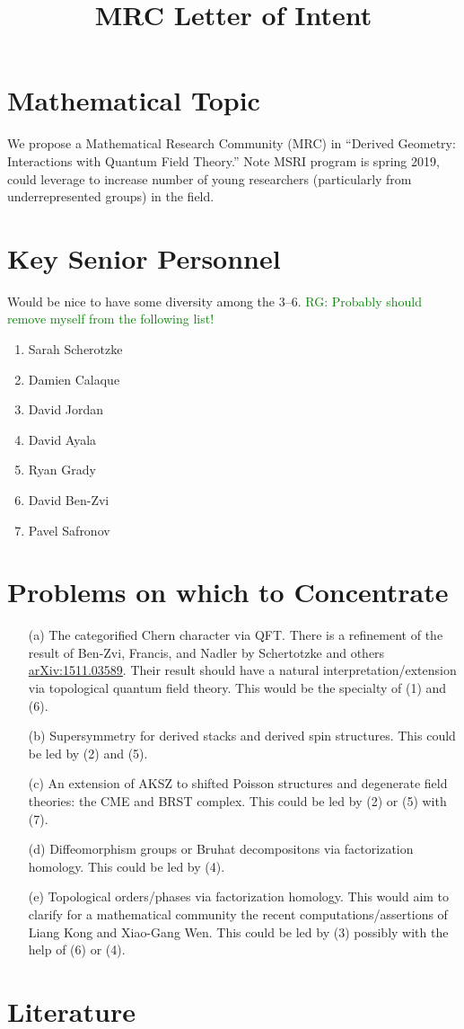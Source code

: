 \documentclass[11pt]{amsart}
\title{MRC Letter of Intent}
\def\ryan{\textcolor{green}{RG: }\textcolor{green}}
\begin{document}
\maketitle

\section*{Mathematical Topic}

We propose a Mathematical Research Community (MRC) in ``Derived Geometry: Interactions with Quantum Field Theory.'' Note MSRI program is spring 2019, could leverage to increase number of young researchers (particularly from underrepresented groups) in the field.

\section*{Key Senior Personnel} Would be nice to have some diversity among the 3--6. \ryan{Probably should remove myself from the following list!}

\begin{enumerate}
\item Sarah Scherotzke
\item Damien Calaque
\item David Jordan
\item David Ayala
\item Ryan Grady
\item David Ben-Zvi
\item Pavel Safronov
\end{enumerate}

\section*{Problems on which to Concentrate}

\begin{itemize}
\item[(a)] The categorified Chern character via QFT.  There is a refinement of the result of Ben-Zvi, Francis, and Nadler by Schertotzke and others \href{https://arxiv.org/abs/1511.03589}{arXiv:1511.03589}.  Their result should have a natural interpretation/extension via topological quantum field theory. This would be the specialty of (1) and (6).
\item[(b)] Supersymmetry for derived stacks and derived spin structures. This could be led by (2) and (5).
\item[(c)] An extension of AKSZ to shifted Poisson structures and degenerate field theories: the CME and BRST complex. This could be led by (2) or (5) with (7).
\item[(d)] Diffeomorphism groups or Bruhat decompositons via factorization homology. This could be led by (4).
\item[(e)] Topological orders/phases via factorization homology. This would aim to clarify for a mathematical community the recent computations/assertions of Liang Kong and Xiao-Gang Wen. This could be led by (3) possibly with the help of (6) or (4).

\end{itemize}




\section*{Literature}
\end{document}
